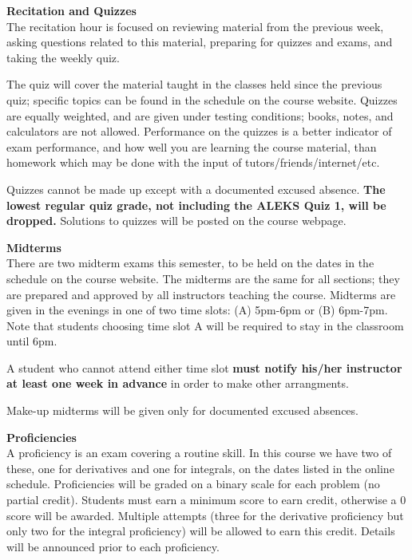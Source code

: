 \documentclass[12pt]{article}
\renewcommand{\emph}[1]{\textsf{\textbf{#1}}}
\newcommand{\localhead}[1]{\par\smallskip\textbf{#1}\nobreak\\}%
\def\heading#1{\localhead{\large\emph{#1}}}
\begin{document}



\heading{Recitation and Quizzes}
The recitation hour is focused on reviewing material from the previous week, asking questions related to this material, preparing for quizzes and exams, and taking the weekly quiz.

The quiz will cover the material taught in the classes held since the previous quiz; specific topics can be found in the schedule on the course website.  Quizzes are equally weighted, and are given under testing conditions; books, notes, and calculators are not allowed.  Performance on the quizzes is a better indicator of exam performance, and how well you are learning the course material, than homework which may be done with the input of tutors/friends/internet/etc.

Quizzes cannot be made up except with a documented excused absence.  \emph{The lowest regular quiz grade, not including the ALEKS Quiz 1, will be dropped.}  Solutions to quizzes will be posted on the course webpage.

\heading{Midterms}
There are two midterm exams this semester, to be held on the dates in the schedule on the course website.  The midterms are the same for all sections; they are prepared and approved by all instructors teaching the course. Midterms are given in the evenings in one of two time slots: (A) 5pm-6pm or (B) 6pm-7pm. Note that students choosing time slot A will be required to stay in the classroom until 6pm.

A student who cannot attend either time slot \emph{must notify his/her instructor at least one week in advance} in order to make other arrangments.

Make-up midterms will be given only for documented excused absences.

\heading{Proficiencies}
A proficiency is an exam covering a routine skill.  In this course we have two of these, one for derivatives and one for integrals, on the dates listed in the online schedule.  Proficiencies will be graded on a binary scale for each problem (no partial credit).  Students must earn a minimum score to earn credit, otherwise a 0 score will be awarded. Multiple attempts (three for the derivative proficiency but only two for the integral proficiency) will be allowed to earn this credit.  Details will be announced prior to each proficiency.
\end{document}

